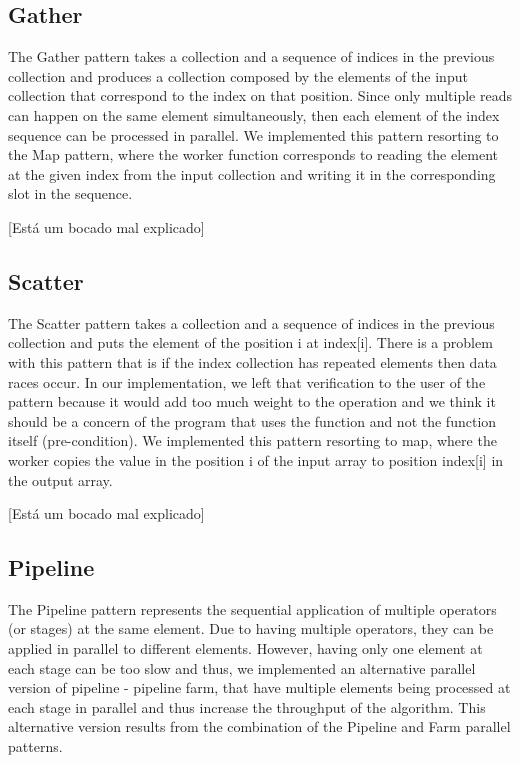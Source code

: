 \documentclass[conference,compsoc]{IEEEtran}
\begin{document}
\subsection{Gather}

The Gather pattern takes a collection and a sequence of indices in the previous collection and produces a collection composed by the elements of the input collection that correspond to the index on that position. Since only multiple reads can happen on the same element simultaneously, then each element of the index sequence can be processed in parallel. We implemented this pattern resorting to the Map pattern, where the worker function corresponds to reading the element at the given index from the input collection and writing it in the corresponding slot in the sequence.

[Está um bocado mal explicado]

\subsection{Scatter}

The Scatter pattern takes a collection and a sequence of indices in the previous collection and puts the element of the position i at index[i]. There is a problem with this pattern that is if the index collection has repeated elements then data races occur. In our implementation, we left that verification to the user of the pattern because it would add too much weight to the operation and we think it should be a concern of the program that uses the function and not the function itself (pre-condition). We implemented this pattern resorting to map, where the worker copies the value in the position i of the input array to position index[i] in the output array.

[Está um bocado mal explicado]

\subsection{Pipeline}
The Pipeline pattern represents the sequential application of multiple operators (or stages) at the same element. Due to having multiple operators, they can be applied in parallel to different elements. However, having only one element at each stage can be too slow and thus, we implemented an alternative parallel version of pipeline - pipeline farm, that have multiple elements being processed at each stage in parallel and thus increase the throughput of the algorithm. This alternative version results from the combination of the Pipeline and Farm parallel patterns.
\end{document}
